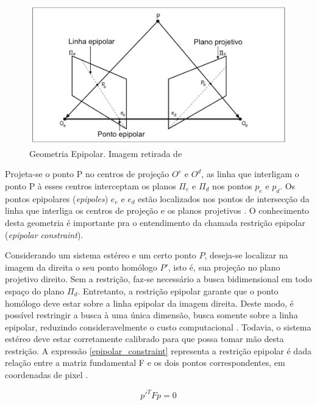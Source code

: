 \begin{figure}[H]
 	\centering
 	\includegraphics[scale=0.35]{./Resources/bradski/geometry_epipolar.png}
 	\caption{Geometria Epipolar. Imagem retirada de \cite{Mendes2012}}
 	\label{geometry_epipolar}
\end{figure}

Projeta-se o ponto P no centros de projeção $O^e$ e $O^d$, as linha que interligam o ponto P à esses centros interceptam os planos $\Pi_e$ e $\Pi_d$ nos pontos $p_e$ e $p_d$. Os pontos epipolares (\textit{epipoles}) $e_e$ e $e_d$ estão localizados nos pontos de intersecção da linha que interliga os centros de projeção e os planos projetivos \cite{Mendes2012}. O conhecimento desta geometria é importante pra o entendimento da chamada restrição epipolar (\textit{epipolar constraint}). 

Considerando um sistema estéreo e um certo ponto $P$, deseja-se localizar na imagem da direita o seu ponto homólogo $P'$, isto é, sua projeção no plano projetivo direito. Sem a restrição, faz-se necessário a busca bidimensional em todo espaço do plano $\Pi_d$. Entretanto, a restrição epipolar garante que o ponto homólogo deve estar sobre a linha epipolar da imagem direita. Deste modo, é possível restringir a busca à uma única dimensão, busca somente sobre a linha epipolar, reduzindo consideravelmente o custo computacional \cite{Bradski2008}. Todavia, o sistema estéreo deve estar corretamente calibrado para que possa tomar mão desta restrição. A expressão \ref{epipolar_constraint} representa a restrição epipolar é dada relação entre a matriz fundamental F e os dois pontos correspondentes, em coordenadas de pixel \cite{RobertLaganiere}.

\begin{equation}
 \label{epipolar_constraint}
 p'^TFp = 0
\end{equation}


